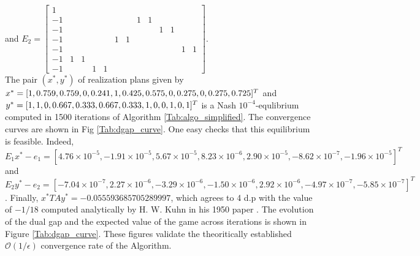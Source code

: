 \documentclass[12pt]{article}
\begin{document}
and $E_2 = \left[\begin{array}{ccccccccccccc}
1 &   &   &   &   &   &   &   &   &   &   &   &  \\
-1 &   &   &   &   &   &   & 1 & 1 &   &   &   &  \\
-1 &   &   &   &   &   &   &   &   & 1 & 1 &   &  \\
-1 &   &   &   &   & 1 & 1 &   &   &   &   &   &  \\
-1 &   &   &   &   &   &   &   &   &   &   & 1 & 1\\
-1 & 1 & 1 &   &   &   &   &   &   &   &   &   &  \\
-1 &   &   & 1 & 1 &   &   &   &   &   &   &   &  
\end{array}\right]$.\\

The pair $(x^*, y^*)$ of realization plans given by $x^* = [1, 0.759, 0.759, 0, 0.241, \\
1, 0.425, 0.575, 0, 0.275, 0, 0.275, 0.725]^T$ and $y^* = [1, 1, 0, 0.667, 0.333, 0.667, \\
0.333, 1, 0, 0, 1, 0, 1]^T$ is a Nash $10^{-4}$-equlibrium computed in 1500 iterations of Algorithm  \ref{Tab:algo_simplified}. The convergence curves are shown in Fig \ref{Tab:dgap_curve}. One easy checks that this equilibrium is feasible. Indeed,  $E_1x^* - e_1 = [4.76 \times 10^{-5}, -1.91 \times 10^{-5}, 5.67 \times 10^{-5}, 8.23 \times 10^{-6}, 2.90 \times 10^{-5}, -8.62 \times 10^{-7}, -1.96 \times 10^{-5}]^T$ and $E_2y^* - e_2 = [-7.04 \times 10^{-7}, 2.27 \times 10^{-6}, -3.29 \times 10^{-6}, -1.50 \times 10^{-6}, 2.92 \times 10^{-6}, -4.97 \times 10^{-7}, -5.85 \times 10^{-7}]^T$. Finally, $x^*TAy^* = -0.055593685705289997$, which agrees to 4 d.p with the value of $-1 / 18$ computed analytically by H. W. Kuhn in his 1950 paper \cite{kuhn}. The evolution of the dual gap and the expected value of the game across iterations is shown in Figure \ref{Tab:dgap_curve}. These figures validate the theoritically established $\mathcal{O}(1/\epsilon)$ convergence rate of the Algorithm.
\end{document}
